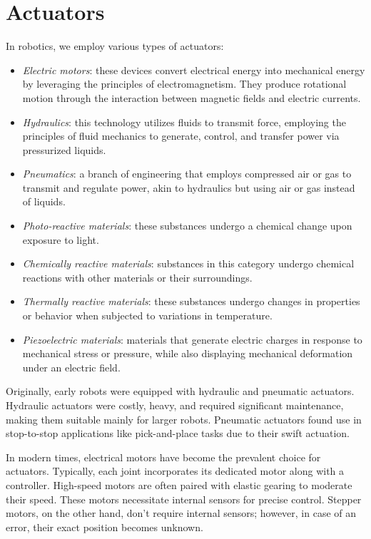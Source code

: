 \section{Actuators}

In robotics, we employ various types of actuators:
\begin{itemize}
    \item \textit{Electric motors}: these devices convert electrical energy into mechanical energy by leveraging the principles of electromagnetism. 
        They produce rotational motion through the interaction between magnetic fields and electric currents.
    \item \textit{Hydraulics}: this technology utilizes fluids to transmit force, employing the principles of fluid mechanics to generate, control, and transfer power via pressurized liquids.
    \item \textit{Pneumatics}: a branch of engineering that employs compressed air or gas to transmit and regulate power, akin to hydraulics but using air or gas instead of liquids.
    \item \textit{Photo-reactive materials}: these substances undergo a chemical change upon exposure to light.
    \item \textit{Chemically reactive materials}: substances in this category undergo chemical reactions with other materials or their surroundings.
    \item \textit{Thermally reactive materials}: these substances undergo changes in properties or behavior when subjected to variations in temperature.
    \item \textit{Piezoelectric materials}: materials that generate electric charges in response to mechanical stress or pressure, while also displaying mechanical deformation under an electric field.
\end{itemize}

Originally, early robots were equipped with hydraulic and pneumatic actuators. 
Hydraulic actuators were costly, heavy, and required significant maintenance, making them suitable mainly for larger robots. 
Pneumatic actuators found use in stop-to-stop applications like pick-and-place tasks due to their swift actuation.

In modern times, electrical motors have become the prevalent choice for actuators. 
Typically, each joint incorporates its dedicated motor along with a controller. 
High-speed motors are often paired with elastic gearing to moderate their speed. 
These motors necessitate internal sensors for precise control. 
Stepper motors, on the other hand, don't require internal sensors; however, in case of an error, their exact position becomes unknown.


